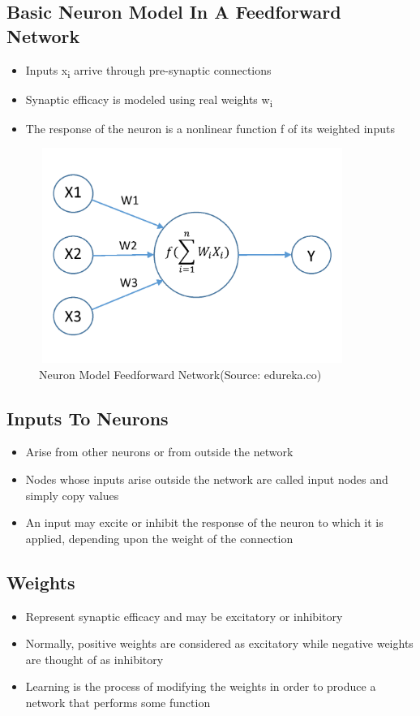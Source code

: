 \subsection{Basic Neuron Model In A Feedforward Network}
\begin{itemize}
    \item Inputs x\textsubscript{i} arrive through pre-synaptic connections 
    \item Synaptic efficacy is modeled using real weights w\textsubscript{i}
    \item The response of the neuron is a nonlinear function f of its weighted inputs
\end{itemize}

 \begin{figure}[h]
  \begin{center}
  \includegraphics[width=100mm,height=70mm]{images/feedforward.jpg}
  \caption{Neuron Model Feedforward Network(Source: edureka.co)}
  \end{center}
  \end{figure}   
  
\subsection{Inputs To Neurons}
\begin{itemize}
    \item Arise from other neurons or from outside the network
    \item Nodes whose inputs arise outside the network are called input nodes and simply copy values
    \item An input may excite or inhibit the response of the neuron to which it is applied, depending upon the weight of the connection
\end{itemize}

\subsection{Weights}
\begin{itemize}
    \item Represent synaptic efficacy and may be excitatory or inhibitory
    \item Normally, positive weights are considered as excitatory while negative weights are thought of as inhibitory
    \item Learning is the process of modifying the weights in order to produce a network that performs some function
\end{itemize}

